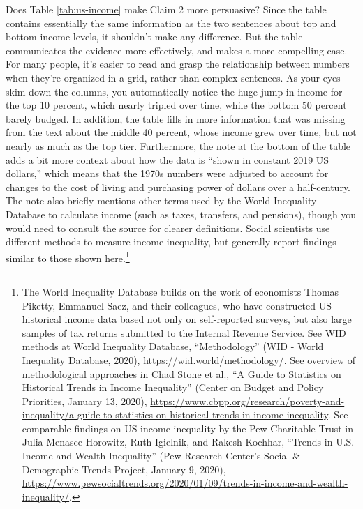 \documentclass[
  english,
]{book}
\begin{document}
Does Table \ref{tab:us-income} make Claim 2 more persuasive? Since the table contains essentially the same information as the two sentences about top and bottom income levels, it shouldn't make any difference. But the table communicates the evidence more effectively, and makes a more compelling case. For many people, it's easier to read and grasp the relationship between numbers when they're organized in a grid, rather than complex sentences. As your eyes skim down the columns, you automatically notice the huge jump in income for the top 10 percent, which nearly tripled over time, while the bottom 50 percent barely budged. In addition, the table fills in more information that was missing from the text about the middle 40 percent, whose income grew over time, but not nearly as much as the top tier. Furthermore, the note at the bottom of the table adds a bit more context about how the data is ``shown in constant 2019 US dollars,'' which means that the 1970s numbers were adjusted to account for changes to the cost of living and purchasing power of dollars over a half-century. The note also briefly mentions other terms used by the World Inequality Database to calculate income (such as taxes, transfers, and pensions), though you would need to consult the source for clearer definitions. Social scientists use different methods to measure income inequality, but generally report findings similar to those shown here.\footnote{The World Inequality Database builds on the work of economists Thomas Piketty, Emmanuel Saez, and their colleagues, who have constructed US historical income data based not only on self-reported surveys, but also large samples of tax returns submitted to the Internal Revenue Service. See WID methods at World Inequality Database, {``Methodology''} ({WID - World Inequality Database}, 2020), \url{https://wid.world/methodology/}. See overview of methodological approaches in Chad Stone et al., {``A {Guide} to {Statistics} on {Historical Trends} in {Income Inequality}''} ({Center on Budget and Policy Priorities}, January 13, 2020), \url{https://www.cbpp.org/research/poverty-and-inequality/a-guide-to-statistics-on-historical-trends-in-income-inequality}. See comparable findings on US income inequality by the Pew Charitable Trust in Julia Menasce Horowitz, Ruth Igielnik, and Rakesh Kochhar, {``Trends in {U}.{S}. Income and Wealth Inequality''} ({Pew Research Center's Social \& Demographic Trends Project}, January 9, 2020), \url{https://www.pewsocialtrends.org/2020/01/09/trends-in-income-and-wealth-inequality/}.}
\end{document}
